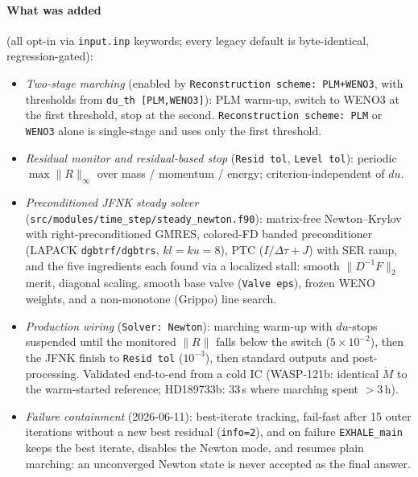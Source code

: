 \documentclass[english,a4paper]{my_memo}
\begin{document}
\paragraph{What was added} (all opt-in via \texttt{input.inp} keywords;
every legacy default is byte-identical, regression-gated):
\begin{itemize}
\item \emph{Two-stage marching} (enabled by \texttt{Reconstruction scheme:
  PLM+WENO3}, with thresholds from \texttt{du\_th [PLM,WENO3]}): PLM warm-up,
  switch to WENO3 at the first threshold, stop at the second.
  \texttt{Reconstruction scheme: PLM} or \texttt{WENO3} alone is single-stage
  and uses only the first threshold.
\item \emph{Residual monitor and residual-based stop} (\texttt{Resid
  tol}, \texttt{Level tol}): periodic $\max\|R\|_\infty$ over mass /
  momentum / energy; criterion-independent of $du$.
\item \emph{Preconditioned JFNK steady solver}
  (\texttt{src/modules/time\_step/steady\_newton.f90}): matrix-free
  Newton--Krylov with right-preconditioned GMRES, colored-FD banded
  preconditioner (LAPACK \texttt{dgbtrf/dgbtrs}, $kl{=}ku{=}8$), PTC
  ($I/\Delta\tau + J$) with SER ramp, and the five ingredients each found
  via a localized stall: smooth $\|D^{-1}F\|_2$ merit, diagonal scaling,
  smooth base valve (\texttt{Valve eps}), frozen WENO weights, and a
  non-monotone (Grippo) line search.
\item \emph{Production wiring} (\texttt{Solver: Newton}): marching
  warm-up with $du$-stops suspended until the monitored $\|R\|$ falls
  below the switch ($5\times10^{-2}$), then the JFNK finish to
  \texttt{Resid tol} ($10^{-3}$), then standard outputs and
  post-processing. Validated end-to-end from a cold IC (WASP-121b:
  identical $\dot M$ to the warm-started reference; HD189733b: 33\,s
  where marching spent $>$3\,h).
\item \emph{Failure containment} (2026-06-11): best-iterate tracking,
  fail-fast after 15 outer iterations without a new best residual
  (\texttt{info=2}), and on failure \texttt{EXHALE\_main} keeps the best
  iterate, disables the Newton mode, and resumes plain marching: an
  unconverged Newton state is never accepted as the final answer.
\end{itemize}
\end{document}
